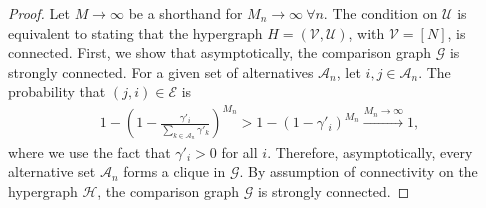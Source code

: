 \begin{proof}
Let $M \to \infty$ be a shorthand for $M_n \to \infty \ \forall n$.
The condition on $\mathcal{U}$ is equivalent to stating that the hypergraph $H = (\mathcal{V}, \mathcal{U})$, with $\mathcal{V} = [N]$, is connected.
First, we show that asymptotically, the comparison graph $\mathcal{G}$ is strongly connected.
For a given set of alternatives $\mathcal{A}_n$, let $i, j \in \mathcal{A}_n$.
The probability that $(j, i) \in \mathcal{E}$ is
\begin{align*}
1 - \left(1 - \frac{\gamma'_i}{\sum_{k \in \mathcal{A}_n} \gamma'_k} \right)^{M_n}
> 1 - (1 - \gamma'_i)^{M_n}
\xrightarrow{M_n \to \infty} 1,
\end{align*}
where we use the fact that $\gamma'_i > 0$ for all $i$.
Therefore, asymptotically, every alternative set $\mathcal{A}_n$ forms a clique in $\mathcal{G}$.
By assumption of connectivity on the hypergraph $\mathcal{H}$, the comparison graph $\mathcal{G}$ is strongly connected.


\end{proof}
